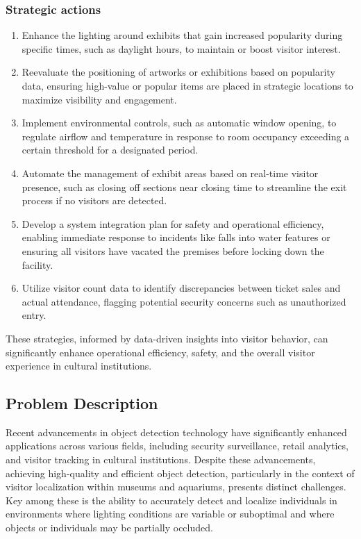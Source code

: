 \subsubsection*{Strategic actions} 
\begin{enumerate}
    \item Enhance the lighting around exhibits that gain increased popularity during specific times, such as daylight hours, to maintain or boost visitor interest.
    \item Reevaluate the positioning of artworks or exhibitions based on popularity data, ensuring high-value or popular items are placed in strategic locations to maximize visibility and engagement.
    \item Implement environmental controls, such as automatic window opening, to regulate airflow and temperature in response to room occupancy exceeding a certain threshold for a designated period.
    \item Automate the management of exhibit areas based on real-time visitor presence, such as closing off sections near closing time to streamline the exit process if no visitors are detected.
    \item Develop a system integration plan for safety and operational efficiency, enabling immediate response to incidents like falls into water features or ensuring all visitors have vacated the premises before locking down the facility.
    \item Utilize visitor count data to identify discrepancies between ticket sales and actual attendance, flagging potential security concerns such as unauthorized entry.
\end{enumerate} 

These strategies, informed by data-driven insights into visitor behavior, can significantly enhance operational efficiency, safety, and the overall visitor experience in cultural institutions.

\subsection{Problem Description} 
Recent advancements in object detection technology have significantly enhanced applications across various fields, including security surveillance, retail analytics, and visitor tracking in cultural institutions. Despite these advancements, achieving high-quality and efficient object detection, particularly in the context of visitor localization within museums and aquariums, presents distinct challenges. Key among these is the ability to accurately detect and localize individuals in environments where lighting conditions are variable or suboptimal and where objects or individuals may be partially occluded.

